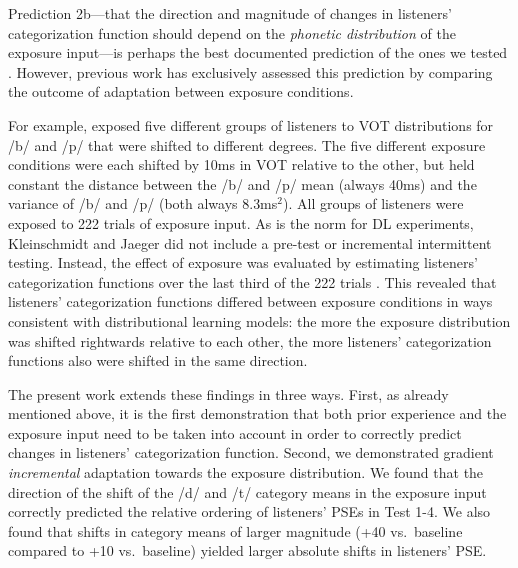 \documentclass[
  11pt,
  man,mask,floatsintext]{apa6}
\begin{document}
Prediction 2b---that the direction and magnitude of changes in listeners' categorization function should depend on the \emph{phonetic distribution} of the exposure input---is perhaps the best documented prediction of the ones we tested \autocite{bejjanki2011,chladkova2017,clayards2008,colby2018,kleinschmidt-jaeger2011,kleinschmidt-jaeger2012,kleinschmidt-jaeger2016,nixon2016,saltzman-myers2021,theodore-monto2019}. However, previous work has exclusively assessed this prediction by comparing the outcome of adaptation between exposure conditions.

For example, \textcite{kleinschmidt-jaeger2016} exposed five different groups of listeners to VOT distributions for /b/ and /p/ that were shifted to different degrees. The five different exposure conditions were each shifted by 10ms in VOT relative to the other, but held constant the distance between the /b/ and /p/ mean (always 40ms) and the variance of /b/ and /p/ (both always 8.3ms\(^2\)). All groups of listeners were exposed to 222 trials of exposure input. As is the norm for DL experiments, Kleinschmidt and Jaeger did not include a pre-test or incremental intermittent testing. Instead, the effect of exposure was evaluated by estimating listeners' categorization functions over the last third of the 222 trials \autocites[another common approach is to average over \emph{all} trials, e.g.,][]{clayards2008,nixon2016}. This revealed that listeners' categorization functions differed between exposure conditions in ways consistent with distributional learning models: the more the exposure distribution was shifted rightwards relative to each other, the more listeners' categorization functions also were shifted in the same direction.

The present work extends these findings in three ways. First, as already mentioned above, it is the first demonstration that both prior experience and the exposure input need to be taken into account in order to correctly predict changes in listeners' categorization function. Second, we demonstrated gradient \emph{incremental} adaptation towards the exposure distribution. We found that the direction of the shift of the /d/ and /t/ category means in the exposure input correctly predicted the relative ordering of listeners' PSEs in Test 1-4. We also found that shifts in category means of larger magnitude (+40 vs.~baseline compared to +10 vs.~baseline) yielded larger absolute shifts in listeners' PSE.
\end{document}
